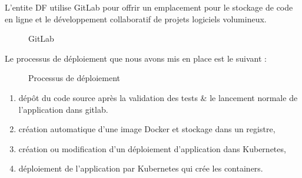 L'entite \gls{DF} utilise GitLab pour offrir un emplacement pour le stockage de code en ligne et le d\'eveloppement collaboratif de projets logiciels volumineux.

\begin{figure}[H]
	\caption{\label{fig:my-label} GitLab}
\end{figure}

Le processus de d\'eploiement que nous avons mis en place est le suivant :

\begin{figure}[H]
	\caption{\label{fig:my-label} Processus de d\'eploiement}
\end{figure}

\begin{enumerate}
\item d\'ep\^ot du code source apr\`es la validation des tests \& le lancement normale de l'application dans gitlab. 
\item cr\'eation automatique d'une image Docker et stockage dans un registre,
\item cr\'eation ou modification d'un d\'eploiement d'application dans Kubernetes,
\item d\'eploiement de l'application par Kubernetes qui cr\'ee les containers.
\end{enumerate}

